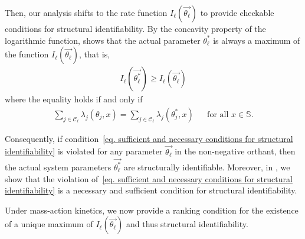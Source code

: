 \documentclass[pdflatex,sn-mathphys-num]{sn-jnl}%
\theoremstyle{thmstyleone}%
\theoremstyle{thmstyletwo}%
\theoremstyle{thmstylethree}%
\begin{document}
Then, our analysis shifts to the rate function $I_{\ell}\left(\overrightarrow{\theta_\ell}\right)$ to provide checkable conditions for structural identifiability. 
By the concavity property of the logarithmic function,  shows that the actual parameter $\theta^*_\ell$ is always a maximum of the function $I_{\ell}\left(\overrightarrow{\theta_\ell}\right)$, that is,
\begin{align*}%
    I_{\ell}\left(\overrightarrow{\theta^*_\ell}\right)
    \geq
    I_{\ell}\left(\overrightarrow{\theta_\ell}\right)
\end{align*}
where the equality holds if and only if 
\begin{align}\label{eq. sufficient and necessary conditions for structural identifiability}
    \sum_{j\in\mathcal C_\ell} \lambda_{j}(\theta_j,x) = \sum_{j\in\mathcal C_\ell} \lambda_{j}(\theta^*_j,x) 
    && 
    \text{for all $x\in\mathbb S$.}
\end{align}

Consequently, if condition~\eqref{eq. sufficient and necessary conditions for structural identifiability} is violated for any parameter $\overrightarrow{\theta_\ell}$ in the non-negative orthant, then the actual system parameters $\overrightarrow{\theta^*_\ell}$ are structurally identifiable.
Moreover, in , we show that the violation of~\eqref{eq. sufficient and necessary conditions for structural identifiability} is a necessary and sufficient condition for structural identifiability.

Under mass-action kinetics, we now provide a ranking condition for the existence of a unique maximum of $I_{\ell}\left(\overrightarrow{\theta_\ell}\right)$ and thus structural identifiability.
\end{document}
